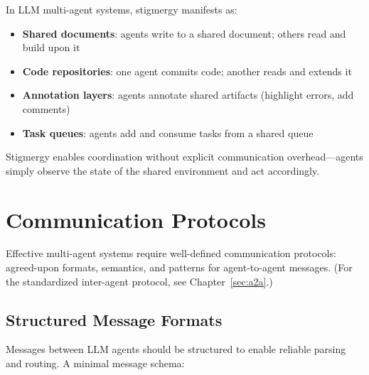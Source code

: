 In LLM multi-agent systems, stigmergy manifests as:

\begin{itemize}
  \item \textbf{Shared documents}: agents write to a shared document; others read and build upon it
  \item \textbf{Code repositories}: one agent commits code; another reads and extends it
  \item \textbf{Annotation layers}: agents annotate shared artifacts (highlight errors, add comments)
  \item \textbf{Task queues}: agents add and consume tasks from a shared queue
\end{itemize}

Stigmergy enables coordination without explicit communication overhead---agents simply observe the state of the shared environment and act accordingly.

\section{Communication Protocols}
\label{subsec:communication-protocols}

Effective multi-agent systems require well-defined communication protocols: agreed-upon formats, semantics, and patterns for agent-to-agent messages. (For the standardized inter-agent protocol, see Chapter~\ref{sec:a2a}.)

\subsection{Structured Message Formats}
\label{structured-message-formats}

Messages between LLM agents should be structured to enable reliable parsing and routing. A minimal message schema:

